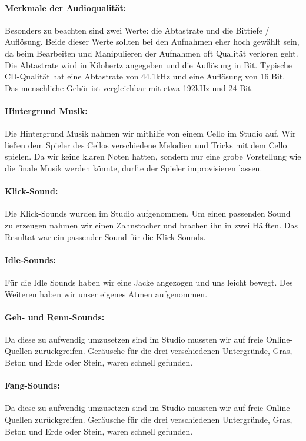 \paragraph{Merkmale der Audioqualität:}
Besonders zu beachten sind zwei Werte: die Abtastrate und die Bittiefe / Auflösung. Beide dieser Werte sollten bei den Aufnahmen
eher hoch gewählt sein, da beim Bearbeiten und Manipulieren der Aufnahmen oft Qualität verloren geht. Die Abtastrate wird in Kilohertz angegeben und die Auflösung in Bit. Typische
CD-Qualität hat eine Abtastrate von 44,1kHz und eine Auflösung von 16 Bit. Das menschliche Gehör ist vergleichbar mit etwa 192kHz und 24 Bit.

\paragraph{Hintergrund Musik:}
Die Hintergrund Musik nahmen wir mithilfe von einem Cello im Studio auf. Wir ließen dem Spieler des Cellos verschiedene Melodien und Tricks mit dem Cello spielen.
Da wir keine klaren Noten hatten, sondern nur eine grobe Vorstellung wie die finale Musik werden könnte, durfte der Spieler improvisieren lassen.

\paragraph{Klick-Sound:}
Die Klick-Sounds wurden im Studio aufgenommen. Um einen passenden Sound zu erzeugen nahmen wir
einen Zahnstocher und brachen ihn in zwei Hälften. Das Resultat war ein passender Sound für die Klick-Sounds.

\paragraph{Idle-Sounds:}
Für die Idle Sounds haben wir eine Jacke angezogen und uns leicht bewegt. Des Weiteren haben wir unser eigenes Atmen aufgenommen.

\paragraph{Geh- und Renn-Sounds:}
Da diese zu aufwendig umzusetzen sind im Studio mussten wir auf freie Online-Quellen zurückgreifen.
Geräusche für die drei verschiedenen Untergründe, Gras, Beton und Erde oder Stein, waren schnell gefunden.

\paragraph{Fang-Sounds:}
Da diese zu aufwendig umzusetzen sind im Studio mussten wir auf freie Online-Quellen zurückgreifen.
Geräusche für die drei verschiedenen Untergründe, Gras, Beton und Erde oder Stein, waren schnell gefunden.

